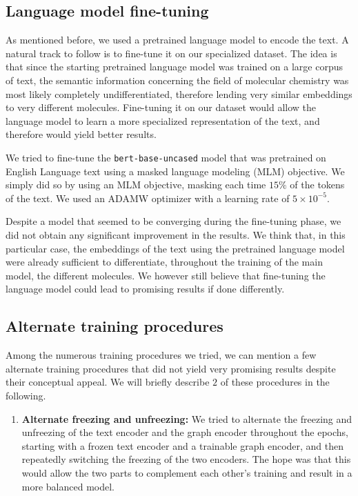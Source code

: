 \documentclass[switch, 11pt]{article}
\begin{document}
\begin{multicols}{2}
    \subsection{Language model fine-tuning}
    As mentioned before, we used a pretrained language model to encode the text. A natural track to follow is to fine-tune it on our specialized dataset. The idea is that since the starting pretrained language model was trained on a large corpus of text, the semantic information concerning the field of molecular chemistry was most likely completely undifferentiated, therefore lending very similar embeddings to very different molecules. Fine-tuning it on our dataset would allow the language model to learn a more specialized representation of the text, and therefore would yield better results.

    We tried to fine-tune the \texttt{bert-base-uncased} model that was pretrained on English Language text using a masked language modeling (MLM) objective. We simply did so by using an MLM objective, masking each time $15\%$ of the tokens of the text. We used an ADAMW optimizer with a learning rate of $5\times 10^{-5}$.

    Despite a model that seemed to be converging during the fine-tuning phase, we did not obtain any significant improvement in the results. We think that, in this particular case, the embeddings of the text using the pretrained language model were already sufficient to differentiate, throughout the training of the main model, the different molecules. We however still believe that fine-tuning the language model could lead to promising results if done differently.
    \subsection{Alternate training procedures}
    Among the numerous training procedures we tried, we can mention a few alternate training procedures that did not yield very promising results despite their conceptual appeal. We will briefly describe $2$ of these procedures in the following.
    \begin{enumerate}
        \item \textbf{Alternate freezing and unfreezing: } We tried to alternate the freezing and unfreezing of the text encoder and the graph encoder throughout the epochs, starting with a frozen text encoder and a trainable graph encoder, and then repeatedly switching the freezing of the two encoders. The hope was that this would allow the two parts to complement each other's training and result in a more balanced model.


\end{enumerate}
\end{multicols}
\end{document}
